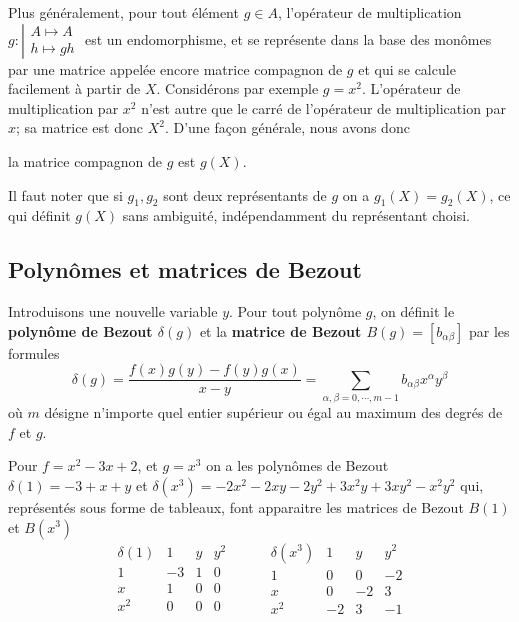 \documentclass{standalone}
\begin{document}
Plus généralement, pour tout élément $g\in A$, l'opérateur de multiplication
$g : \left\vert
\begin{array}{c}
A \mapsto A \\
h \mapsto gh
\end{array}
\right.$
est un endomorphisme, et se représente dans la base des monômes par une matrice appelée encore matrice compagnon de $g$ et qui se calcule facilement à partir de $X$. Considérons par exemple $g = x^2$. L'opérateur de multiplication par $x^2$ n'est autre que le carré de l'opérateur de multiplication par $x$; sa matrice est donc $X^2$. D'une façon générale, nous avons donc
\begin{prop}
la matrice compagnon de $g$ est $g(X)$.
\end{prop}

\begin{rem}
Il faut noter que si $g_1, g_2$ sont deux représentants de $g$ on a $g_1(X) = g_2(X)$, ce qui définit $g(X)$ sans ambiguité, indépendamment du représentant choisi.
\end{rem}

\subsection{Polynômes et matrices de Bezout}
\begin{defn}
\label{def_bez}
Introduisons une nouvelle variable $y$.
Pour tout polynôme $g$, on définit le {\bf polynôme de Bezout $\delta(g)$} et la {\bf matrice de Bezout $B(g) = [b_{\alpha\beta}]$}  par les formules
\begin{equation}
\delta(g) = \dfrac{f(x)g(y)-f(y)g(x)}{x-y} = \sum_{\alpha,\beta = 0, \cdots, m-1} b_{\alpha\beta} x^\alpha y^\beta
\end{equation}
où $m$ désigne n'importe quel entier supérieur ou égal au maximum des degrés de $f$ et $g$.
\end{defn}

\begin{exmp}
Pour $f = x^2 - 3x + 2$, et $g = x^3$ on a les polynômes de Bezout $\delta(1) = -3 + x + y$ et $\delta(x^3) = -2x^2 - 2xy -2y^2 + 3x^2y + 3xy^2 -x^2y^2$ qui, représentés sous forme de tableaux, font apparaitre les matrices de Bezout $B(1)$ et $B(x^3)$
$$
\begin{array}{c|ccc}
\delta(1) & 1 & y & y^2\\
\hline
1 & -3 & 1 & 0\\
x & 1 & 0 & 0\\
x^2 & 0 & 0 & 0
\end{array}
\hspace{1cm}
\begin{array}{c|ccc}
\delta(x^3) & 1 & y & y^2\\
\hline
1 & 0 & 0 & -2\\
x & 0 & -2 & 3\\
x^2 & -2 & 3 & -1
\end{array}
$$
\end{exmp}
\end{document}
